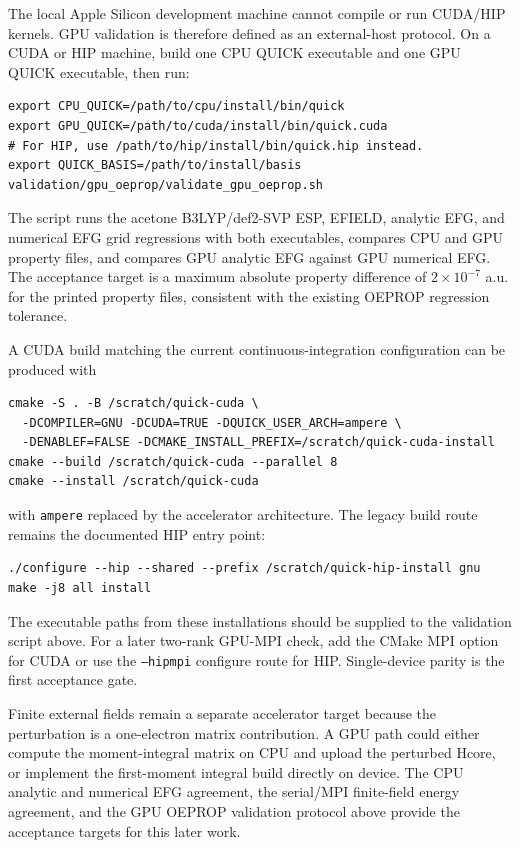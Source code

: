 \documentclass[journal=jcisd8,manuscript=suppinfo]{achemso}
\begin{document}
The local Apple Silicon development machine cannot compile or run CUDA/HIP kernels.  GPU validation is therefore defined as an external-host protocol.  On a CUDA or HIP machine, build one CPU QUICK executable and one GPU QUICK executable, then run:
\begin{verbatim}
export CPU_QUICK=/path/to/cpu/install/bin/quick
export GPU_QUICK=/path/to/cuda/install/bin/quick.cuda
# For HIP, use /path/to/hip/install/bin/quick.hip instead.
export QUICK_BASIS=/path/to/install/basis
validation/gpu_oeprop/validate_gpu_oeprop.sh
\end{verbatim}
The script runs the acetone B3LYP/def2-SVP ESP, EFIELD, analytic EFG, and numerical EFG grid regressions with both executables, compares CPU and GPU property files, and compares GPU analytic EFG against GPU numerical EFG.  The acceptance target is a maximum absolute property difference of \(2\times10^{-7}\) a.u. for the printed property files, consistent with the existing OEPROP regression tolerance.

A CUDA build matching the current continuous-integration configuration can be produced with
\begin{verbatim}
cmake -S . -B /scratch/quick-cuda \
  -DCOMPILER=GNU -DCUDA=TRUE -DQUICK_USER_ARCH=ampere \
  -DENABLEF=FALSE -DCMAKE_INSTALL_PREFIX=/scratch/quick-cuda-install
cmake --build /scratch/quick-cuda --parallel 8
cmake --install /scratch/quick-cuda
\end{verbatim}
with \texttt{ampere} replaced by the accelerator architecture.  The legacy build route remains the documented HIP entry point:
\begin{verbatim}
./configure --hip --shared --prefix /scratch/quick-hip-install gnu
make -j8 all install
\end{verbatim}
The executable paths from these installations should be supplied to the validation script above.  For a later two-rank GPU-MPI check, add the CMake MPI option for CUDA or use the \texttt{--hipmpi} configure route for HIP.  Single-device parity is the first acceptance gate.

Finite external fields remain a separate accelerator target because the perturbation is a one-electron matrix contribution.  A GPU path could either compute the moment-integral matrix on CPU and upload the perturbed Hcore, or implement the first-moment integral build directly on device.  The CPU analytic and numerical EFG agreement, the serial/MPI finite-field energy agreement, and the GPU OEPROP validation protocol above provide the acceptance targets for this later work.
\end{document}
